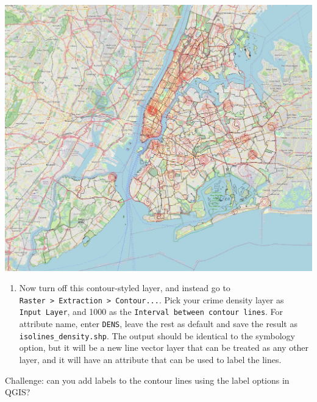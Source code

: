 \documentclass[
  letterpaper,
  DIV=11,
  numbers=noendperiod]{scrreprt}
\providecommand{\tightlist}{%
  \setlength{\itemsep}{0pt}\setlength{\parskip}{0pt}}\usepackage{longtable,booktabs,array}
\begin{document}
\includegraphics{images/lab_13/lab13_fig_Isolines.jpg}

\begin{enumerate}
\def\labelenumi{(\arabic{enumi})}
\setcounter{enumi}{345}
\tightlist
\item
  Now turn off this contour-styled layer, and instead go to
  \texttt{Raster\ \textgreater{}\ Extraction\ \textgreater{}\ Contour...}.
  Pick your crime density layer as \texttt{Input\ Layer}, and 1000 as
  the \texttt{Interval\ between\ contour\ lines}. For attribute name,
  enter \texttt{DENS}, leave the rest as default and save the result as
  \texttt{isolines\_density.shp}. The output should be identical to the
  symbology option, but it will be a new line vector layer that can be
  treated as any other layer, and it will have an attribute that can be
  used to label the lines.
\end{enumerate}

\begin{tcolorbox}[enhanced jigsaw, coltitle=black, toprule=.15mm, breakable, opacitybacktitle=0.6, left=2mm, colback=white, leftrule=.75mm, rightrule=.15mm, colbacktitle=quarto-callout-important-color!10!white, toptitle=1mm, titlerule=0mm, colframe=quarto-callout-important-color-frame, arc=.35mm, bottomtitle=1mm, opacityback=0, bottomrule=.15mm, title=\textcolor{quarto-callout-important-color}{\faExclamation}\hspace{0.5em}{Stop and Think}]

Challenge: can you add labels to the contour lines using the label
options in QGIS?

\end{tcolorbox}
\end{document}
